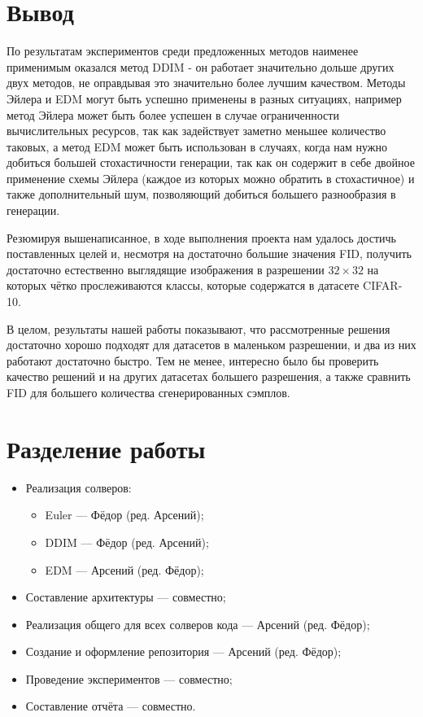 \documentclass[a4paper]{article}
\begin{document}
    \section{Вывод}
    По результатам экспериментов среди предложенных методов наименее применимым оказался метод DDIM - он работает значительно дольше других двух методов, не оправдывая это значительно более лучшим качеством. Методы Эйлера и EDM могут быть успешно применены в разных ситуациях, например метод Эйлера может быть более успешен в случае ограниченности вычислительных ресурсов, так как задействует заметно меньшее количество таковых, а метод EDM может быть использован в случаях, когда нам нужно добиться большей стохастичности генерации, так как он содержит в себе двойное применение схемы Эйлера (каждое из которых можно обратить в стохастичное) и также дополнительный шум, позволяющий добиться большего разнообразия в генерации.

    Резюмируя вышенаписанное, в ходе выполнения проекта нам удалось достичь поставленных целей и, несмотря на достаточно большие значения FID, получить достаточно естественно выглядящие изображения в разрешении $32 \times 32$ на которых чётко прослеживаются классы, которые содержатся в датасете CIFAR-10.
    \par В целом, результаты нашей работы показывают, что рассмотренные решения достаточно хорошо подходят для датасетов в маленьком разрешении, и два из них работают достаточно быстро. Тем не менее, интересно было бы проверить качество решений и на других датасетах большего разрешения, а также сравнить FID для большего количества сгенерированных сэмплов.

    \section{Разделение работы}
    \begin{itemize}
        \item Реализация солверов:
            \begin{itemize}
                \item Euler --- Фёдор (ред. Арсений);
                \item DDIM --- Фёдор (ред. Арсений);
                \item EDM --- Арсений (ред. Фёдор);
            \end{itemize}
        \item Составление архитектуры --- совместно;
        \item Реализация общего для всех солверов кода --- Арсений (ред. Фёдор);
        \item Создание и оформление репозитория --- Арсений (ред. Фёдор);
        \item Проведение экспериментов --- совместно;
        \item Составление отчёта --- совместно.
    \end{itemize}
\end{document}
